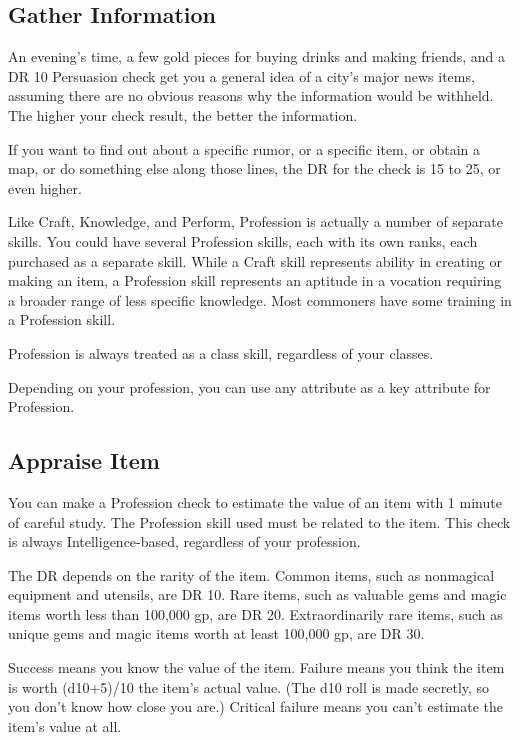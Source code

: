     \subsection{Gather Information}
        An evening's time, a few gold pieces for buying drinks and making friends, and a DR 10 Persuasion check get you a general idea of a city's major news items, assuming there are no obvious reasons why the information would be withheld. The higher your check result, the better the information.

        If you want to find out about a specific rumor, or a specific item, or obtain a map, or do something else along those lines, the DR for the check is 15 to 25, or even higher.

        Like Craft, Knowledge, and Perform, Profession is actually a number of separate skills. You could have several Profession skills, each with its own ranks, each purchased as a separate skill. While a Craft skill represents ability in creating or making an item, a Profession skill represents an aptitude in a vocation requiring a broader range of less specific knowledge. Most commoners have some training in a Profession skill.

        Profession is always treated as a class skill, regardless of your classes.

        Depending on your profession, you can use any attribute as a key attribute for Profession.

    \subsection{Appraise Item}
        You can make a Profession check to estimate the value of an item with 1 minute of careful study. The Profession skill used must be related to the item.
        This check is always Intelligence-based, regardless of your profession.

        The DR depends on the rarity of the item. Common items, such as nonmagical equipment and utensils, are DR 10. Rare items, such as valuable gems and magic items worth less than 100,000 gp, are DR 20. Extraordinarily rare items, such as unique gems and magic items worth at least 100,000 gp, are DR 30.

        Success means you know the value of the item. Failure means you think the item is worth (d10+5)/10 \mtimes the item's actual value. (The d10 roll is made secretly, so you don't know how close you are.) Critical failure means you can't estimate the item's value at all.

